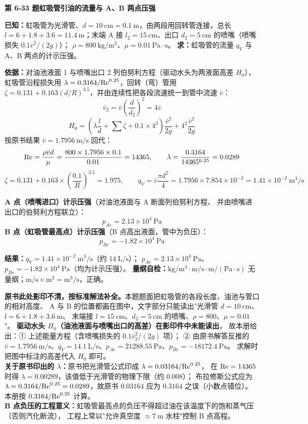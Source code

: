 \noindent\textbf{第 6-33 题\quad 虹吸管引油的流量与 A、B 两点压强}

\begin{jie}
\textbf{已知：}虹吸管为光滑管、$d=10\ \mathrm{cm}=0.1\ \mathrm{m}$，由两段用回转管连接，总长
$l=6+1.8+3.6=11.4\ \mathrm{m}$；末端 A 接 $l_2=15\ \mathrm{cm}$、出口 $d_2=5\ \mathrm{cm}$ 的喷嘴（喷嘴损失 $0.1\bar v^2/(2g)$）；
$\rho=800\ \mathrm{kg/m^3}$、$\mu=0.01\ \mathrm{Pa\cdot s}$。
\textbf{求：}虹吸管的流量 $q_V$ 与 A、B 两点的计示压强。

\textbf{依据：}对油池液面 1 与喷嘴出口 2 列伯努利方程（驱动水头为两液面高差 $H_0$），
虹吸管沿程损失用 $\lambda=0.3164/\mathrm{Re}^{0.25}$，回转（弯）管用
$\zeta=0.131+0.163(d/R)^{3.5}$，并由连续性把各段流速统一到管中流速 $\bar v$：
\[ \bar v_2=\bar v\left(\frac{d}{d_2}\right)^2=4\bar v \]
\[ H_0=\left(\lambda\frac ld+\sum\zeta+0.1\times4^2\right)\frac{\bar v^2}{2g}+4^2\frac{\bar v^2}{2g} \]
按原书结果 $\bar v=1.7956\ \mathrm{m/s}$ 回代：
\[ \mathrm{Re}=\frac{\rho\bar vd}{\mu}=\frac{800\times1.7956\times0.1}{0.01}=14365,\qquad
\lambda=\frac{0.3164}{14365^{0.25}}=0.0289 \]
\[ \zeta=0.131+0.163\times\left(\frac{0.1}{R}\right)^{3.5}=1.975,\qquad
q_V=\bar v\frac{\pi d^2}{4}=1.7956\times7.854\times10^{-3}=1.41\times10^{-2}\ \mathrm{m^3/s} \]

\textbf{A 点（喷嘴进口）计示压强}（对油池液面与 A 断面列伯努利方程、
并由喷嘴进出口的伯努利方程联立）：
\[ p_{Ae}=2.13\times10^4\ \mathrm{Pa} \]
\textbf{B 点（虹吸管最高点）计示压强}（B 点高出液面，管中为负压）：
\[ p_{Be}=-1.82\times10^4\ \mathrm{Pa} \]

\textbf{结果：}$q_V=1.41\times10^{-2}\ \mathrm{m^3/s}$（约 $14\ \mathrm{L/s}$）；
$p_{Ae}=2.13\times10^4\ \mathrm{Pa}$、$p_{Be}=-1.82\times10^4\ \mathrm{Pa}$（均为计示压强）。
\textbf{量纲自检：}$\mathrm{kg/m^3\cdot m/s\cdot m/(Pa\cdot s)}$ 无量纲；$\mathrm{m/s\times m^2}=\mathrm{m^3/s}$，正确。
\end{jie}

\begin{tishi}
\textbf{原书此处影印不清，按标准解法补全。}本题题面把虹吸管的各段长度、油池与管口的相对高度、
A 与 B 的位置都画在图中，文字部分只能读出"光滑管 $d=10\ \mathrm{cm}$、$l=6+1.8+3.6\ \mathrm{m}$、
末端接 $l=15\ \mathrm{cm}$、$d_2=5\ \mathrm{cm}$ 的喷嘴、$\rho=800$、$\mu=0.01$"。
\textbf{驱动水头 $H_0$（油池液面与喷嘴出口的高差）在影印件中未能读出}，
故本册给出：① 上述能量方程（含喷嘴损失的 $0.1\bar v_2^2/(2g)$ 项）；
② 由原书解答反推的 $\bar v=1.7956\ \mathrm{m/s}$、$q_V=14.1\ \mathrm{L/s}$、$p_{Ae}=21288.55\ \mathrm{Pa}$、$p_{Be}=-18172.4\ \mathrm{Pa}$。
求解时把图中标注的高差代入 $H_0$ 即可。\\
\textbf{关于原书印出的 $\lambda$：}原书把光滑管公式印成 $\lambda=0.03164/\mathrm{Re}^{0.25}$，
在 $\mathrm{Re}=14365$ 时得 $\lambda=0.00289$，该值低于光滑管的物理下限（约 $0.008$）；
布拉修斯公式应为 $\lambda=0.3164/\mathrm{Re}^{0.25}=0.0289$，故原书 $0.03164$ 应为 $0.3164$ 之误（小数点错位）。
本册按 $0.3164/\mathrm{Re}^{0.25}$ 计算。\\
\textbf{B 点负压的工程意义：}虹吸管最高点的负压不得超过油在该温度下的饱和蒸气压（否则汽化断流），
工程上常以"允许真空度 $\approx7\ \mathrm{m}$ 水柱"控制 B 点高程。
\end{tishi}

